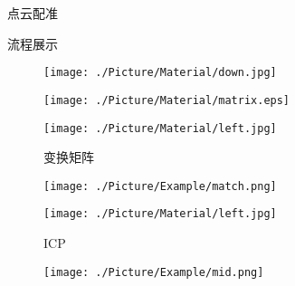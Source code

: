 \documentclass[xcolor=table,compress,blue]{beamer}
\begin{document}
\begin{frame}{点云配准}
\begin{exampleblock}{流程展示}
\begin{figure}[htpb]
\begin{minipage}[b]{0.8in}
				\end{minipage}
				\begin{minipage}[b]{0.6in}
					\centerline{ \texttt{[image: ./Picture/Material/down.jpg]} }
				\end{minipage}
			\end{figure}
			\vspace{-50pt} 
			\hspace{-65pt}
			\vspace{15pt} 
			\begin{figure}[htpb]
				\centering
				\begin{minipage}[b]{0.8in}
					\label{PROBLEM-------cann't show matirx img}
					\centerline{ \texttt{[image: ./Picture/Material/matrix.eps]} }
				\end{minipage}
				\begin{minipage}[b]{0.8in}
					\centerline{ \quad}
					\centerline{ \texttt{[image: ./Picture/Material/left.jpg]} }
					\centerline{\tiny{变换矩阵}}
				\end{minipage}
				\begin{minipage}[b]{0.8in}
					\centerline{ \texttt{[image: ./Picture/Example/match.png]} }
				\end{minipage}
				\begin{minipage}[b]{0.8in}
					\centerline{ \texttt{[image: ./Picture/Material/left.jpg]} }
					\centerline{\tiny{ICP}}
				\end{minipage}
				\begin{minipage}[b]{0.8in}
					\centerline{ \texttt{[image: ./Picture/Example/mid.png]} }
				\end{minipage}
			\end{figure}
		\end{exampleblock}
	\end{frame}
\end{document}
